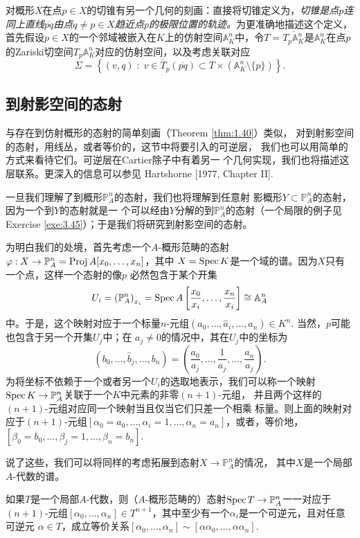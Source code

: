 对概形$X$在点$p\in X$的切锥有另一个几何的刻画：直接将切锥定义为，\textit{切锥是点$p$连同上直线$\overline{pq}$由点$q\neq p\in X$趋近点$p$的极限位置的轨迹。}为更准确地描述这个定义，首先假设$p\in X$的一个邻域被嵌入在$K$上的仿射空间$\mathbb A_K^n$中，令$T=\overline{T_p\mathbb A_K^n}$是$\mathbb A_K^n$在点$p$的Zariski切空间$T_p\mathbb A_K^n$对应的仿射空间，以及考虑关联对应
\[
	\Sigma = \left\{(v,q)\;:\;v\in \overline{T}_p(\overline{pq})\subset T\times (\mathbb A_K^n \setminus \{p\})\right\}.
\]


\subsection{到射影空间的态射} \label{s:3.2.5}

与存在到仿射概形的态射的简单刻画（Theorem \ref{thm:1.40}）类似，
对到射影空间的态射，用线丛，或者等价的，这节中将要引入的可逆层，
我们也可以用简单的方式来看待它们。可逆层在Cartier除子中有着另一
个几何实现，我们也将描述这层联系。更深入的信息可以参见
Hartshorne [1977, Chapter II].

一旦我们理解了到概形$\mathbb P_A^n$的态射，我们也将理解到任意射  
影概形$Y\subset \mathbb P_A^n$的态射，因为一个到$Y$的态射就是一
个可以经由$Y$分解的到$\mathbb P_A^n$的态射（一个局限\nottran 的例子见
Exercise \ref{exe:3.45}）；于是我们将研究到射影空间的态射。

为明白我们的处境，首先考虑一个$A$-概形范畴的态射
$\varphi:X\to \mathbb P^n_A=\operatorname{Proj} A[x_0,\dots,x_n]$，其中
$X=\operatorname{Spec} K$是一个域的谱。因为$X$只有一个点，这样一个态射的像$p$
必然包含于某个开集
\[
	U_i=\left(\mathbb P_A^n\right)_{x_i}=\operatorname{Spec} A\left[
	\frac{x_0}{x_i},\dots,\frac{x_n}{x_i}\right]\cong \mathbb A_A^n
\]
中。于是，这个映射对应于一个标量$n$-元组$(a_0,\dots,\hat a_i,
\dots,a_n)\in K^n$. 当然，$p$可能也包含于另一个开集$U_j$中；在
$a_j\neq 0$的情况中，其在$U_j$中的坐标为
\[
	(b_0,\dots,\hat b_j,\dots,b_n)=\left(
	\frac{a_0}{a_j},\dots,\frac{1}{a_j},\dots,\frac{a_n}{a_j}
	\right).
\]
为将坐标不依赖于一个或者另一个$U_i$的选取地表示，我们可以称一个映射
$\operatorname{Spec} K\to \mathbb P_A^n$关联于一个$K$中元素的非零$(n+1)$-元组，
并且两个这样的$(n+1)$-元组对应同一个映射当且仅当它们只差一个相乘
标量。则上面的映射对应于$(n+1)$-元组$[\alpha_0=a_0,\dots,\alpha_i
=1,\dots,\alpha_n=a_n]$，或者，等价地，$[\beta_0=b_0,\dots,
\beta_j=1,\dots,\beta_n=b_n]$.

说了这些，我们可以将同样的考虑拓展到态射$X\to \mathbb P^n_A$的情况，
其中$X$是一个局部$A$-代数的谱。

\begin{pro}\label{pro:3.36}
如果$T$是一个局部$A$-代数，则（$A$-概形范畴的）态射$\operatorname{Spec} T\to 
\mathbb P_A^n$一一对应于$(n+1)$-元组$[\alpha_0,\dots,\alpha_n]
\in T^{n+1}$，其中至少有一个$\alpha_i$是一个可逆元，且对任意可逆元
$\alpha\in T$，成立等价关系$[\alpha_0,\dots,\alpha_n]\sim 
[\alpha\alpha_0,\dots,\alpha\alpha_n]$.
\end{pro}

